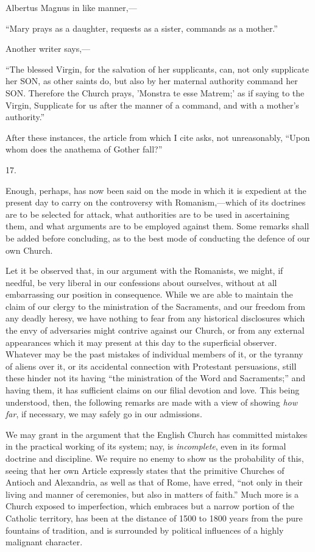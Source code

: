 Albertus Magnus in like manner,—

``Mary
prays as a daughter, requests as a sister, commands as a mother.''

Another writer says,—

``The
blessed Virgin, for the salvation of her supplicants, can, not only
supplicate her SON,
as other saints do, but also by her maternal authority command her SON. Therefore the Church prays, 'Monstra
te esse Matrem;' as if saying to the Virgin, Supplicate for us after
the manner of a command, and with a mother's authority.''

After these instances, the article from which I
cite asks, not unreasonably, ``Upon whom does the anathema of Gother
fall?''

17.

Enough, perhaps, has now been said on the mode in
which it is expedient at the present day to carry on the controversy
with Romanism,—which of its doctrines are to be selected for attack,
what authorities are to be used in ascertaining them, and what
arguments are to be employed against them. Some remarks shall be added
before concluding, as to the best mode of conducting the defence of
our own Church.

Let it be observed that, in our argument with the
Romanists, we might, if needful, be very liberal in our confessions
about ourselves, without at all embarrassing our position in
consequence. While we are able to maintain the claim of our clergy to
the ministration of the Sacraments, and our freedom from any deadly
heresy, we have nothing to fear from any historical disclosures which
the envy of adversaries might contrive against our Church, or from any
external appearances which it may present at this day to the
superficial observer. Whatever may be the past mistakes of individual
members of it, or the tyranny of aliens over it, or its accidental
connection with Protestant persuasions, still these hinder not
its having ``the ministration of the Word and Sacraments;'' and having
them, it has sufficient claims on our filial devotion and love. This
being understood, then, the following remarks are made with a view of
showing \emph{how far}, if necessary, we may safely go in our
admissions.

We may grant in the argument that the English
Church has committed mistakes in the practical working of its system;
nay, is \emph{incomplete}, even in its formal doctrine and discipline.
We require no enemy to show us the probability of this, seeing that
her own Article expressly states that the primitive Churches of
Antioch and Alexandria, as well as that of Rome, have erred, ``not only
in their living and manner of ceremonies, but also in matters of
faith.'' Much more is a Church exposed to imperfection, which embraces
but a narrow portion of the Catholic territory, has been at the
distance of 1500 to 1800 years from the pure fountains of tradition,
and is surrounded by political influences of a highly malignant
character.

